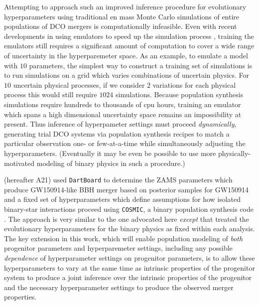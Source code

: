 \documentclass[twocolumn]{aastex631}
\begin{document}
Attempting to approach such an improved inference procedure for evolutionary
hyperparameters using traditional en mass Monte Carlo simulations of entire
populations of DCO mergers is computationally infeasible. Even with recent
developments in using emulators to speed up the simulation process
\citep[e.g.][]{Wong2021}, training the emulators still requires a significant
amount of computation to cover a wide range of uncertainty in the hyperparemeter
space. As an example, to emulate a model with $10$ parameters, the simplest way
to construct a training set of simulations is to run simulations on a grid which
varies combinations of uncertain physics. For $10$ uncertain physical processes,
if we consider $2$ variations for each physical process this would still require
$1024$ simulations. Because population synthesis simulations require hundreds to
thousands of cpu hours, training an emulator which spans a high dimensional
uncertainty space remains an impossibility at present.  Thus inference of
hyperpameter settings must proceed \emph{dynamically}, generating trial DCO
systems via population synthesis recipes to match a particular observation one-
or few-at-a-time while simultaneously adjusting the hyperparameters. (Eventually
it may be even be possible to use more physically-motivated modeling of binary
physics \citep[e.g.][]{Gallego-Garcia2021} in such a procedure.)

\citet{Andrews2021} (hereafter A21) used \texttt{DartBoard} \citep{Andrews2018}
to determine the ZAMS parameters which produce GW150914-like BBH merger based on
posterior samples for GW150914 and a fixed set of hyperparameters which define
assumptions for how isolated binary-star interactions proceed using
\texttt{COSMIC}, a binary population synthesis code \citep{Breivik2020}. The
approach is very similar to the one advocated here \emph{except} that
\citet{Andrews2021} treated the evolutionary hyperparameters for the binary
physics as fixed within each analysis.  The key extension in this work, which
will enable population modeling of \emph{both} progenitor parameters and
hyperparemeter settings, including any possible \emph{dependence} of
hyperparameter settings on progenitor parameters, is to allow these
hyperparameters to vary at the same time as intrinsic properties of the
progenitor system to produce a joint inference over the intrinsic properties of
the progenitor and the necessary hyperparameter settings to produce the observed
merger properties.
\end{document}
